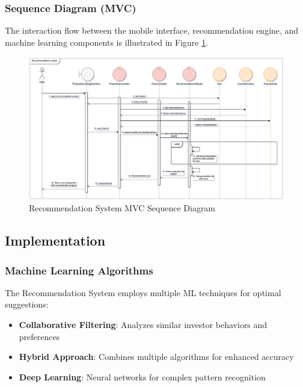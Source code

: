\subsubsection{Sequence Diagram (MVC)}
The interaction flow between the mobile interface, recommendation engine, and machine learning components is illustrated in Figure \ref{fig:recommendation-sequence-mvc}.
\newpage

\begin{figure}[htbp]
    \centering
    \includegraphics[width=1\textwidth]{images/recommendation_sequence_mvc.png}
    \caption{Recommendation System MVC Sequence Diagram}
    \label{fig:recommendation-sequence-mvc}
\end{figure}

\subsection{Implementation}
\subsubsection{Machine Learning Algorithms}
The Recommendation System employs multiple ML techniques for optimal suggestions:

\begin{itemize}
    \item \textbf{Collaborative Filtering}: Analyzes similar investor behaviors and preferences
    \item \textbf{Hybrid Approach}: Combines multiple algorithms for enhanced accuracy
    \item \textbf{Deep Learning}: Neural networks for complex pattern recognition
\end{itemize}


